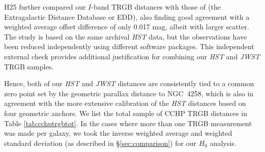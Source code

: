 \documentclass[12pt,modern]{aastex631}
\newcommand{\ho}{$H_{0}$\xspace}
\newcommand{\hst}{\emph{HST}\xspace}
\newcommand{\jwst}{\emph{JWST}\xspace}
\newcommand{\ngc}{NGC\,\xspace}
\begin{document}
H25 further compared our $I$-band TRGB distances with those of \citet{anand_2022} (the Extragalactic Distance Database or EDD), also finding good agreement with a weighted average offset difference of only 0.017 mag, albeit with larger scatter. The \citeauthor{anand_2022} study is based on the same archival \hst data, but the observations have been reduced independently using different software packages. This independent external check provides additional justification for combining our \hst and \jwst TRGB samples. 


Hence, both of our \hst and \jwst distances are consistently tied to a common zero point set by the geometric parallax distance to \ngc 4258, which is also in agreement with the more extensive calibration of the \hst distances based on four geometric anchors. 
We list the total sample of CCHP TRGB distances in Table \ref{tab:cchptrgbtot}.  In the cases where more than one TRGB measurement was made per galaxy, we took the inverse weighted average and weighted standard deviation (as described in \S\ref{sec:comparison}) for our \ho analysis.
\end{document}
